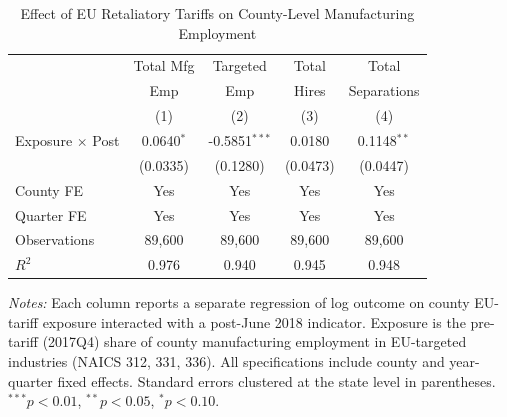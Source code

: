 \begin{table}[htbp]
\centering
\caption{Effect of EU Retaliatory Tariffs on County-Level Manufacturing Employment}
\label{tab:main}
\begin{tabular}{lcccc}
\toprule
 & Total Mfg & Targeted & Total & Total \\
 & Emp & Emp & Hires & Separations \\
 & (1) & (2) & (3) & (4) \\
\midrule
Exposure $\times$ Post & 0.0640$^{*}$ & -0.5851$^{***}$ & 0.0180 & 0.1148$^{**}$ \\
 & (0.0335) & (0.1280) & (0.0473) & (0.0447) \\
\midrule
County FE & Yes & Yes & Yes & Yes \\
Quarter FE & Yes & Yes & Yes & Yes \\
Observations & 89,600 & 89,600 & 89,600 & 89,600 \\
$R^2$ & 0.976 & 0.940 & 0.945 & 0.948 \\
\bottomrule
\end{tabular}
\begin{tablenotes}[flushleft]
\small
\item \textit{Notes:} Each column reports a separate regression of log outcome on county EU-tariff exposure interacted with a post-June 2018 indicator. Exposure is the pre-tariff (2017Q4) share of county manufacturing employment in EU-targeted industries (NAICS 312, 331, 336). All specifications include county and year-quarter fixed effects. Standard errors clustered at the state level in parentheses. $^{***}p<0.01$, $^{**}p<0.05$, $^{*}p<0.10$.
\end{tablenotes}
\end{table}
